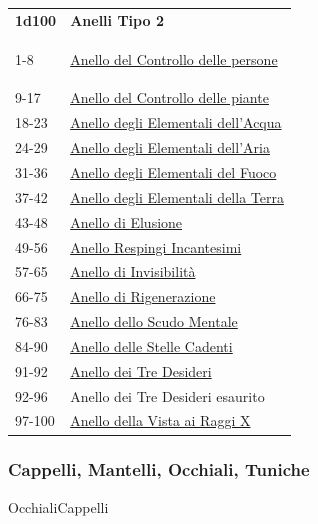 \begin{multicols}{2}
{{\small\begin{tabular}{ll}
\textbf{1d100} & \textbf{Anelli Tipo 2}\\\hypertarget{Anello Tipo 2}{}
1-8 & \hyperlink{AnellodelControllodellepersone}{Anello del Controllo delle persone}\\
9-17 & \hyperlink{AnellodelControllodellepiante}{Anello del Controllo delle piante}\\
18-23 & \hyperlink{AnellodegliElementalidell'Acqua}{Anello degli Elementali dell'Acqua}\\
24-29 & \hyperlink{AnellodegliElementalidell'Aria}{Anello degli Elementali dell'Aria}\\
31-36 & \hyperlink{AnellodegliElementalidelFuoco}{Anello degli Elementali del Fuoco}\\
37-42 & \hyperlink{AnellodegliElementalidellaTerra}{Anello degli Elementali della Terra}\\
43-48 & \hyperlink{Anello di Elusione}{Anello di Elusione}\\
49-56 & \hyperlink{AnelloRespingiIncantesimi}{Anello Respingi Incantesimi}\\
57-65 & \hyperlink{AnellodiInvisibilità}{Anello di Invisibilità}\\
66-75 & \hyperlink{AnellodiRigenerazione}{Anello di Rigenerazione}\\
76-83 & \hyperlink{AnellodelloScudoMentale}{Anello dello Scudo Mentale}\\
84-90 & \hyperlink{AnellodelleStelleCadenti}{Anello delle Stelle Cadenti}\\
91-92 & \hyperlink{AnellodeiTreDesideri}{Anello dei Tre Desideri}\\
92-96 & Anello dei Tre Desideri esaurito\\
97-100 & \hyperlink{AnellodellaVistaaiRaggiX}{Anello della Vista ai Raggi X}

\end{tabular}}

\subsubsection{Cappelli, Mantelli, Occhiali, Tuniche}\label{cappellimantelli}\hypertarget{Mantelli}{}\hypertarget{Tuniche}{}\hypertarget{Occhiali}{Occhiali}\hypertarget{Cappelli}{Cappelli}

}
\end{multicols}
